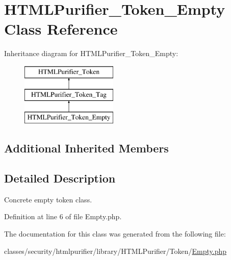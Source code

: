 \hypertarget{classHTMLPurifier__Token__Empty}{\section{H\+T\+M\+L\+Purifier\+\_\+\+Token\+\_\+\+Empty Class Reference}
\label{classHTMLPurifier__Token__Empty}
}
Inheritance diagram for H\+T\+M\+L\+Purifier\+\_\+\+Token\+\_\+\+Empty\+:\begin{figure}[H]
\begin{center}
\leavevmode
\includegraphics[height=3.000000cm]{classHTMLPurifier__Token__Empty}
\end{center}
\end{figure}
\subsection*{Additional Inherited Members}


\subsection{Detailed Description}
Concrete empty token class. 

Definition at line 6 of file Empty.\+php.



The documentation for this class was generated from the following file\+:\begin{DoxyCompactItemize}
\item 
classes/security/htmlpurifier/library/\+H\+T\+M\+L\+Purifier/\+Token/\hyperlink{Token_2Empty_8php}{Empty.\+php}\end{DoxyCompactItemize}
